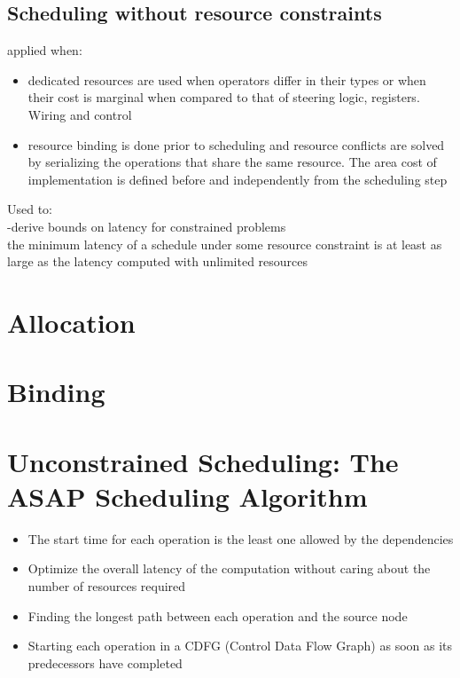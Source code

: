 \documentclass[conference]{IEEEtran}
\begin{document}
\subsection{Scheduling without resource constraints}

applied when:

\begin{itemize}
\item dedicated resources are used
\subitem	when operators differ in their types
\subitem 	or when their cost is marginal when compared to that of steering logic, registers. Wiring and control
\item	resource binding is done prior to scheduling and resource conflicts are solved by serializing the operations that share the same resource.
\subitem The area cost of implementation is defined before and independently from the scheduling step
\end{itemize}
Used to:\\

-derive bounds on latency for constrained problems\\

 the minimum latency of a schedule under some resource constraint is at least as large as the latency computed with unlimited resources\\
 
 \section{Allocation\\}
 
\section{Binding\\}


 \section{Unconstrained Scheduling: The ASAP Scheduling Algorithm}
\begin{itemize}
\item The start time for each operation is the least one allowed by the dependencies
\item Optimize the overall latency of the computation without caring about the number of resources required
\item Finding the longest path between each operation and the source node
\item Starting each operation in a CDFG (Control Data Flow Graph) as soon as its predecessors have completed\\
\end{itemize}
\end{document}
